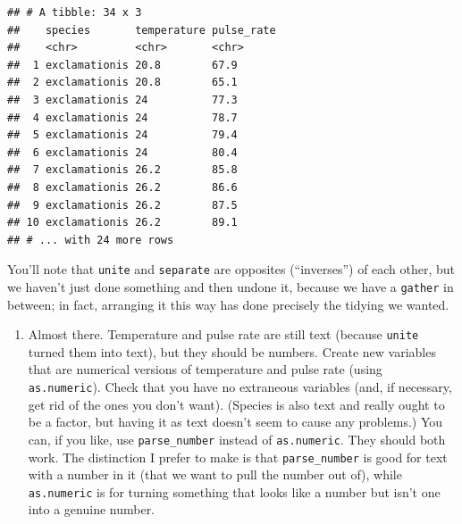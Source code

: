 \documentclass[]{tufte-book}
\newenvironment{Shaded}{}{}
\newcommand{\KeywordTok}[1]{\textcolor[rgb]{0.00,0.44,0.13}{\textbf{#1}}}
\newcommand{\NormalTok}[1]{#1}
\newcommand{\OperatorTok}[1]{\textcolor[rgb]{0.40,0.40,0.40}{#1}}
\newcommand{\StringTok}[1]{\textcolor[rgb]{0.25,0.44,0.63}{#1}}
\providecommand{\tightlist}{%
  \setlength{\itemsep}{0pt}\setlength{\parskip}{0pt}}
\theoremstyle{definition}
\theoremstyle{definition}
\theoremstyle{definition}
\theoremstyle{remark}
\begin{document}
\begin{Shaded}
\end{Shaded}

\begin{verbatim}
## # A tibble: 34 x 3
##    species       temperature pulse_rate
##    <chr>         <chr>       <chr>     
##  1 exclamationis 20.8        67.9      
##  2 exclamationis 20.8        65.1      
##  3 exclamationis 24          77.3      
##  4 exclamationis 24          78.7      
##  5 exclamationis 24          79.4      
##  6 exclamationis 24          80.4      
##  7 exclamationis 26.2        85.8      
##  8 exclamationis 26.2        86.6      
##  9 exclamationis 26.2        87.5      
## 10 exclamationis 26.2        89.1      
## # ... with 24 more rows
\end{verbatim}

You'll note that \texttt{unite} and \texttt{separate} are opposites
(``inverses'') of each other, but we haven't just done something and
then undone it, because we have a \texttt{gather} in between; in fact,
arranging it this way has done precisely the tidying we wanted.

\begin{enumerate}
\def\labelenumi{(\alph{enumi})}
\setcounter{enumi}{4}
\tightlist
\item
  Almost there. Temperature and pulse rate are still text (because
  \texttt{unite} turned them into text), but they should be numbers.
  Create new variables that are numerical versions of temperature and
  pulse rate (using \texttt{as.numeric}). Check that you have no
  extraneous variables (and, if necessary, get rid of the ones you don't
  want). (Species is also text and really ought to be a factor, but
  having it as text doesn't seem to cause any problems.) You can, if you
  like, use \texttt{parse\_number} instead of \texttt{as.numeric}. They
  should both work. The distinction I prefer to make is that
  \texttt{parse\_number} is good for text with a number in it (that we
  want to pull the number out of), while \texttt{as.numeric} is for
  turning something that looks like a number but isn't one into a
  genuine number.
\end{enumerate}
\end{document}
